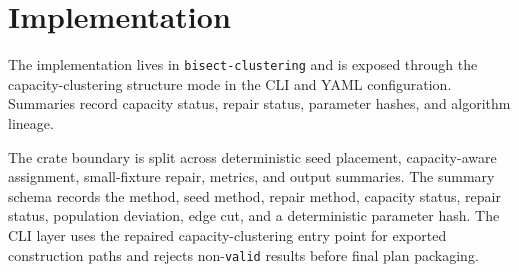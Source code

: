 \section{Implementation}

The implementation lives in \texttt{bisect-clustering} and is exposed through
the capacity-clustering structure mode in the CLI and YAML configuration.
Summaries record capacity status,
repair status, parameter hashes, and algorithm lineage.

The crate boundary is split across deterministic seed placement, capacity-aware
assignment, small-fixture repair, metrics, and output summaries. The summary
schema records the method, seed method, repair method, capacity status, repair
status, population deviation, edge cut, and a deterministic parameter hash. The
CLI layer uses the repaired capacity-clustering entry point for exported
construction paths and rejects non-\texttt{valid} results before final plan
packaging.
